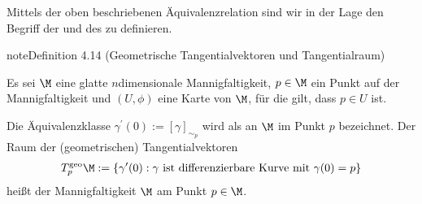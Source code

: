 \documentclass[letterpaper,10pt,german]{jupyterBook}
\begin{document}
\sphinxAtStartPar
Mittels der oben beschriebenen Äquivalenzrelation sind wir in der Lage den Begriff der  und des  zu definieren.
\label{manifolds/tangential:definition-5}
\begin{sphinxadmonition}{note}{Definition 4.14 (Geometrische Tangentialvektoren und Tangentialraum)}



\sphinxAtStartPar
Es sei \(\M\) eine glatte \(n\)\sphinxhyphen{}dimensionale Mannigfaltigkeit, \(p\in\M\) ein Punkt auf der Mannigfaltigkeit und \((U,\phi)\) eine Karte von \(\M\), für die gilt, dass \(p\in U\) ist.

\sphinxAtStartPar
Die Äquivalenzklasse \(\gamma^\prime(0):=[\gamma]_{\sim_p}\) wird als  an \(\M\) im Punkt \(p\) bezeichnet.
Der Raum der (geometrischen) Tangentialvektoren
\begin{equation*}
\begin{split}T_p^{\text{geo}}\M := \{\gamma^\prime(0): \gamma\text{ ist differenzierbare Kurve mit }\gamma(0)=p\}\end{split}
\end{equation*}
\sphinxAtStartPar
heißt  der Mannigfaltigkeit \(\M\) am Punkt \(p \in \M\).
\end{sphinxadmonition}
\end{document}
